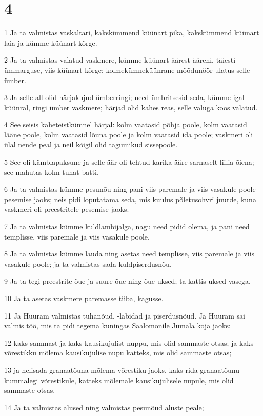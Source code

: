 \chapter{4}

\par 1 Ja ta valmistas vaskaltari, kakskümmend küünart pika, kakskümmend küünart laia ja kümme küünart kõrge.
\par 2 Ja ta valmistas valatud vaskmere, kümme küünart äärest ääreni, täiesti ümmarguse, viis küünart kõrge; kolmekümneküünrane mõõdunöör ulatus selle ümber.
\par 3 Ja selle all olid härjakujud ümberringi; need ümbritsesid seda, kümme igal küünral, ringi ümber vaskmere; härjad olid kahes reas, selle valuga koos valatud.
\par 4 See seisis kaheteistkümnel härjal: kolm vaatasid põhja poole, kolm vaatasid lääne poole, kolm vaatasid lõuna poole ja kolm vaatasid ida poole; vaskmeri oli ülal nende peal ja neil kõigil olid tagumikud sissepoole.
\par 5 See oli kämblapaksune ja selle äär oli tehtud karika ääre sarnaselt liilia õiena; see mahutas kolm tuhat batti.
\par 6 Ja ta valmistas kümme pesunõu ning pani viis paremale ja viis vasakule poole pesemise jaoks; neis pidi loputatama seda, mis kuulus põletusohvri juurde, kuna vaskmeri oli preestritele pesemise jaoks.
\par 7 Ja ta valmistas kümme kuldlambijalga, nagu need pidid olema, ja pani need templisse, viis paremale ja viis vasakule poole.
\par 8 Ja ta valmistas kümme lauda ning asetas need templisse, viis paremale ja viis vasakule poole; ja ta valmistas sada kuldpiserdusnõu.
\par 9 Ja ta tegi preestrite õue ja suure õue ning õue uksed; ta kattis uksed vasega.
\par 10 Ja ta asetas vaskmere paremasse tiiba, kagusse.
\par 11 Ja Huuram valmistas tuhanõud, -labidad ja piserdusnõud. Ja Huuram sai valmis töö, mis ta pidi tegema kuningas Saalomonile Jumala koja jaoks:
\par 12 kaks sammast ja kaks kausikujulist nuppu, mis olid sammaste otsas; ja kaks võrestikku mõlema kausikujulise nupu katteks, mis olid sammaste otsas;
\par 13 ja nelisada granaatõuna mõlema võrestiku jaoks, kaks rida granaatõunu kummalegi võrestikule, katteks mõlemale kausikujulisele nupule, mis olid sammaste otsas.
\par 14 Ja ta valmistas alused ning valmistas pesunõud aluste peale;
